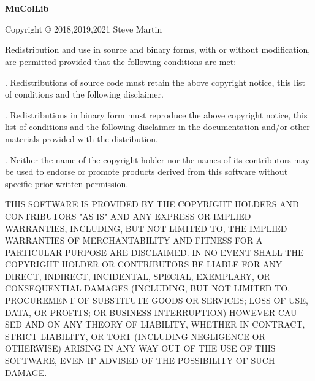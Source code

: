 \chapter*{}
\begin{center}
{\bf\large MuColLib}

Copyright \copyright{} 2018,2019,2021 Steve Martin
\end{center}

Redistribution and use in source and binary forms, with or without modification, are permitted provided that the following conditions are met:

. Redistributions of source code must retain the above copyright notice, this list of conditions and the following disclaimer.
\bigskip

. Redistributions in binary form must reproduce the above copyright notice, this list of conditions and the following disclaimer in the documentation and/or other materials provided with the distribution.
\bigskip

. Neither the name of the copyright holder nor the names of its contributors may be used to endorse or promote products derived from this software without specific prior written permission.
\bigskip

THIS SOFTWARE IS PROVIDED BY THE COPYRIGHT HOLDERS AND CONTRIBUTORS "AS IS" AND ANY EXPRESS OR IMPLIED WARRANTIES, INCLUDING, BUT NOT LIMITED TO, THE IMPLIED WARRANTIES OF MERCHANTABILITY AND FITNESS FOR A PARTICULAR PURPOSE ARE DISCLAIMED. IN NO EVENT SHALL THE COPYRIGHT HOLDER OR CONTRIBUTORS BE LIABLE FOR ANY DIRECT, INDIRECT, INCIDENTAL, SPECIAL, EXEMPLARY, OR CONSEQUENTIAL DAMAGES (INCLUDING, BUT NOT LIMITED TO, PROCUREMENT OF SUBSTITUTE GOODS OR SERVICES; LOSS OF USE, DATA, OR PROFITS; OR BUSINESS INTERRUPTION) HOWEVER CAU-SED AND ON ANY THEORY OF LIABILITY, WHETHER IN CONTRACT, STRICT LIABILITY, OR TORT (INCLUDING NEGLIGENCE OR OTHERWISE) ARISING IN ANY WAY OUT OF THE USE OF THIS SOFTWARE, EVEN IF ADVISED OF THE POSSIBILITY OF SUCH DAMAGE.

